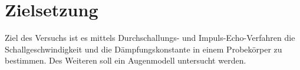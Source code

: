 
\section{Zielsetzung}
\label{sec:Zielsetzung}

Ziel des Versuchs ist es mittels Durchschallungs- und Impuls-Echo-Verfahren die Schallgeschwindigkeit und die Dämpfungskonstante in einem Probekörper zu bestimmen.
Des Weiteren soll ein Augenmodell untersucht werden.